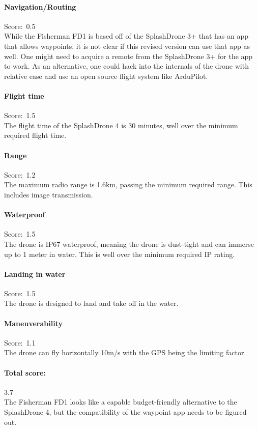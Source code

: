 \paragraph{Navigation/Routing}\mbox{Score: 0.5} \\
While the Fisherman FD1 is based off of the SplashDrone 3+ that has an app that allows waypoints, it is not clear if this revised version can use that app as well. One might need to acquire a remote from the SplashDrone 3+ for the app to work.
As an alternative, one could hack into the internals of the drone with relative ease and use an open source flight system like ArduPilot.

\paragraph{Flight time}\mbox{Score: 1.5} \\
The flight time of the SplashDrone 4 is 30 minutes, well over the minimum required flight time.

\paragraph{Range}\mbox{Score: 1.2} \\
The maximum radio range is 1.6km, passing the minimum required range. This includes image transmission.

\paragraph{Waterproof}\mbox{Score: 1.5} \\
The drone is IP67 waterproof, meaning the drone is dust-tight and can immerse up to 1 meter in water. This is well over the minimum required IP rating.

\paragraph{Landing in water}\mbox{Score: 1.5} \\
The drone is designed to land and take off in the water.

\paragraph{Maneuverability}\mbox{Score: 1.1} \\
The drone can fly horizontally 10m/s with the GPS being the limiting factor.

\paragraph{Total score:}\mbox{3.7} \\
The Fisherman FD1 looks like a capable budget-friendly alternative to the SplashDrone 4, but the compatibility of the waypoint app needs to be figured out.

